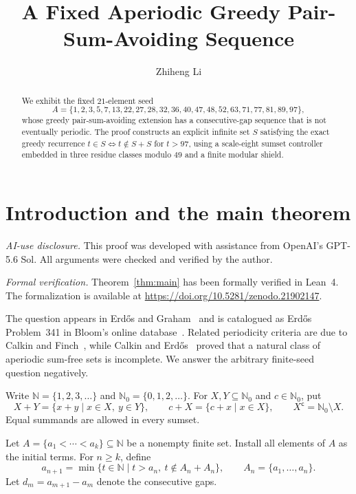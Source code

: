 \documentclass[11pt,letterpaper]{article}
\title{A Fixed Aperiodic Greedy Pair-Sum-Avoiding Sequence}
\author{Zhiheng Li}
\date{}
\newcommand{\N}{\mathbb{N}}
\newcommand{\Nzero}{\mathbb{N}_0}
\newcommand{\cpl}[1]{#1^{\mathsf{c}}}
\begin{document}
\maketitle

\begin{abstract}
We exhibit the fixed \(21\)-element seed
\[
A=\{1,2,3,5,7,13,22,27,28,32,36,40,47,48,52,63,71,77,81,89,97\},
\]
whose greedy pair-sum-avoiding extension has a consecutive-gap sequence that is not eventually periodic. The proof constructs an explicit infinite set \(S\) satisfying the exact greedy recurrence \(t\in S\Longleftrightarrow t\notin S+S\) for \(t>97\), using a scale-eight sumset controller embedded in three residue classes modulo \(49\) and a finite modular shield.
\end{abstract}

\section{Introduction and the main theorem}

\noindent\textit{AI-use disclosure.} This proof was developed with assistance from OpenAI's GPT-5.6 Sol. All arguments were checked and verified by the author.

\noindent\textit{Formal verification.} Theorem~\ref{thm:main} has been formally verified in Lean~4. The formalization is available at \href{https://doi.org/10.5281/zenodo.21902147}{https://doi.org/10.5281/zenodo.21902147}.

The question appears in Erd\H{o}s and Graham~\cite[p.~53]{ErdosGraham1980} and is catalogued as Erd\H{o}s Problem~341 in Bloom's online database~\cite{Bloom341}. Related periodicity criteria are due to Calkin and Finch~\cite{CalkinFinch1996}, while Calkin and Erd\H{o}s~\cite{CalkinErdos1996} proved that a natural class of aperiodic sum-free sets is incomplete. We answer the arbitrary finite-seed question negatively.

Write \(\N=\{1,2,3,\ldots\}\) and \(\Nzero=\{0,1,2,\ldots\}\). For \(X,Y\subseteq\Nzero\) and \(c\in\Nzero\), put
\[
X+Y=\{x+y\mid x\in X,\ y\in Y\},
\qquad
c+X=\{c+x\mid x\in X\},
\qquad
\cpl{X}=\Nzero\setminus X.
\]
Equal summands are allowed in every sumset.

Let \(A=\{a_1<\cdots<a_k\}\subseteq\N\) be a nonempty finite set. Install all elements of \(A\) as the initial terms. For \(n\geq k\), define
\begin{equation}\label{eq:greedy-definition}
a_{n+1}
=\min\{t\in\N\mid t>a_n,\ t\notin A_n+A_n\},
\qquad
A_n=\{a_1,\ldots,a_n\}.
\end{equation}
Let \(d_m=a_{m+1}-a_m\) denote the consecutive gaps.
\end{document}
